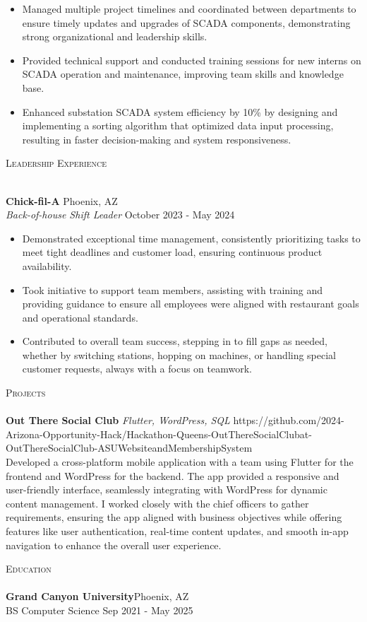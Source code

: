 \documentclass[a4paper]{article}
\newcommand{\lineunder} {
    \vspace*{-8pt} \\
    \hspace*{-18pt} \hrulefill \\
}
\newcommand{\header} [1] {
    {\hspace*{-18pt}\vspace*{6pt} \textsc{#1}}
    \vspace*{-6pt} \lineunder
}
\begin{document}
\begin{itemize} \itemsep 1pt
	\item Managed multiple project timelines and coordinated between departments to ensure timely updates and upgrades of SCADA components, demonstrating strong organizational and leadership skills.
	\item Provided technical support and conducted training sessions for new interns on SCADA operation and maintenance, improving team skills and knowledge base.
	\item Enhanced substation SCADA system efficiency by 10\% by designing and implementing a sorting algorithm that optimized data input processing, resulting in faster decision-making and system responsiveness.

	\end{itemize}

\header{Leadership Experience}
\vspace{1mm}

\textbf{Chick-fil-A} \hfill Phoenix, AZ\\
\textit{Back-of-house Shift Leader} \hfill October 2023 - May 2024\\
\vspace{-1mm}
\begin{itemize} \itemsep 1pt
	\item Demonstrated exceptional time management, consistently prioritizing tasks to meet tight deadlines and customer load, ensuring continuous product availability.
	\item Took initiative to support team members, assisting with training and providing guidance to ensure all employees were aligned with restaurant goals and operational standards.
	\item Contributed to overall team success, stepping in to fill gaps as needed, whether by switching stations, hopping on machines, or handling special customer requests, always with a focus on teamwork.
 
\end{itemize}

\header{Projects}
{\textbf{Out There Social Club}} {\sl Flutter, WordPress, SQL} \hfill https://github.com/2024-Arizona-Opportunity-Hack/Hackathon-Queens-OutThereSocialClubat-OutThereSocialClub-ASUWebsiteandMembershipSystem\\
Developed a cross-platform mobile application with a team using Flutter for the frontend and WordPress for the backend. The app provided a responsive and user-friendly interface, seamlessly integrating with WordPress for dynamic content management. I worked closely with the chief officers to gather requirements, ensuring the app aligned with business objectives while offering features like user authentication, real-time content updates, and smooth in-app navigation to enhance the overall user experience.\\
\vspace*{2mm}

\header{Education}
\textbf{Grand Canyon University}\hfill Phoenix, AZ\\
BS Computer Science \hfill Sep 2021 - May 2025\\
\vspace{2mm}


\ 
\end{document}
